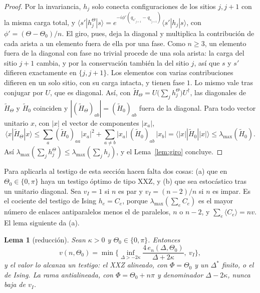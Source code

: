\documentclass[11pt,a4paper]{article}
\newtheorem{lema}[teorema]{Lema}
\theoremstyle{remark}
\newcommand{\ket}[1]{|#1\rangle}
\newcommand{\bra}[1]{\langle #1|}
\newcommand{\ev}[1]{\langle #1\rangle}
\begin{document}
\begin{proof}
Por la invariancia, $h_j$ solo conecta configuraciones de los sitios $j,j{+}1$ con la misma carga
total, y $\bra{s'}h^\Theta_j\ket s=e^{-i\phi'(q_{s'_{j+1}}-q_{s_{j+1}})}\bra{s'}h_j\ket s$, con
$\phi'=(\Theta-\Theta_0)/n$. El giro, pues, deja la diagonal y multiplica la contribución de cada arista a un elemento fuera de
ella por una fase. Como $n\ge3$, un elemento fuera de la diagonal con fase no trivial procede de una
sola arista: la carga del sitio $j{+}1$ cambia, y por la conservación también la del sitio $j$, así
que $s$ y $s'$ difieren exactamente en $\{j,j{+}1\}$. Los elementos con varias contribuciones
difieren en un solo sitio, con su carga intacta, y tienen fase $1$. Lo mismo vale tras conjugar por
$U$, que es diagonal. Así, con $\tilde H_\Theta=U\big(\sum_jh_j^\Theta\big)U^\dagger$, las diagonales
de $\tilde H_\Theta$ y $\tilde H_0$ coinciden y $|(\tilde H_\Theta)_{ab}|=(\tilde H_0)_{ab}$ fuera de
la diagonal. Para todo vector unitario $x$, con $|x|$ el vector de componentes $|x_a|$,
\[
  \bra x\tilde H_\Theta\ket x\le\sum_a(\tilde H_0)_{aa}|x_a|^2+\sum_{a\ne b}|x_a|\,(\tilde H_0)_{ab}\,|x_b|
  =\bra{|x|}\tilde H_0\ket{|x|}\le\lambda_{\max}(\tilde H_0).
\]
Así $\lambda_{\max}(\sum_jh_j^\Theta)\le\lambda_{\max}(\sum_jh_j)$, y el Lema~\ref{lem:giro} concluye.
\end{proof}

Para aplicarla al testigo de esta sección hacen falta dos cosas: (a) que en $\Theta_0\in\{0,\pi\}$ haya
un testigo óptimo de tipo XXZ, y (b) que sea estocástico tras un unitario diagonal. Sea $v_I=1$ si $n$
es par y $v_I=(n-2)/n$ si $n$ es impar. Es el cociente del testigo de Ising $h_e=C_e$, porque
$\lambda_{\max}(\sum_eC_e)$ es el mayor número de enlaces antiparalelos menos el de paralelos, $n$
o $n-2$, y $\sum_e\ev{C_e}=nv$. El lema siguiente da (a).

\begin{lema}[reducción]\label{lem:reduccion}
Sean $\kappa>0$ y $\Theta_0\in\{0,\pi\}$. Entonces
\[
  v(n,\Theta_0)=\min\Big\{\inf_{\Delta>-2\kappa}\frac{4\,e_n(\Delta,\Theta_0)}{\Delta+2\kappa},\ v_I\Big\},
\]
y el valor lo alcanza un testigo: el XXZ \emph{alineado}, con $\Phi=\Theta_0$ y un $\Delta^\ast$
finito, o el de Ising. La rama \emph{antialineada}, con $\Phi=\Theta_0+n\pi$ y denominador $\Delta-2\kappa$, nunca
baja de $v_I$.
\end{lema}
\end{document}
